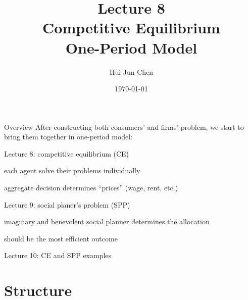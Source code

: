 \documentclass[11pt,aspectratio=169,usenames,dvipsnames]{beamer}
\title[Lecture 8]{Lecture 8 \\ Competitive Equilibrium \\ One-Period Model}
\author[Hui-Jun Chen]{Hui-Jun Chen}
\institute[NTHU]{National Tsing Hua University}
\date{\today}
\let\tempone\itemize
\let\temptwo\enditemize
\renewenvironment{itemize}{\tempone\addtolength{\itemsep}{\fill}}{\temptwo}
\begin{document}
\begin{frame}[plain]
    \titlepage
\end{frame}

\begin{frame}{Overview}
\label{slide:Overview}
    After constructing both \alert{consumers'} and \alert{firms'} problem, we start to bring them together in \alert{one-period model}:
    \begin{itemize}
        \item Lecture 8: \alert{competitive equilibrium} (CE)
        \begin{itemize}
            \item each agent solve their problems individually
            \item aggregate decision determines ``prices'' (wage, rent, etc.)
        \end{itemize}
        \item Lecture 9: \alert{social planer's problem} (SPP)
        \begin{itemize}
            \item imaginary and benevolent social planner determines the allocation
            \item should be the most efficient outcome
        \end{itemize}
        \item Lecture 10: CE and SPP examples
    \end{itemize}
\end{frame}

\section{Structure}
\label{sec:Structure}
\end{document}
